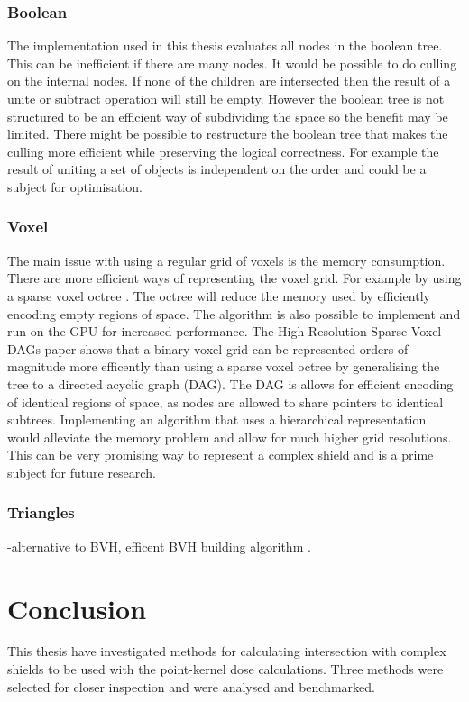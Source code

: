 \documentclass[11pt,twoside,a4paper]{report}
\begin{document}
\subsection{Boolean}
The implementation used in this thesis evaluates all nodes in the boolean tree. This can be inefficient if there are many nodes. It would be possible to do culling on the internal nodes. If none of the children are intersected then the result of a unite or subtract operation will still be empty. However the boolean tree is not structured to be an efficient way of subdividing the space so the benefit may be limited. There might be possible to restructure the boolean tree that makes the culling more efficient while preserving the logical correctness. For example the result of uniting a set of objects is independent on the order and could be a subject for optimisation.

\subsection{Voxel}
The main issue with using a regular grid of voxels is the memory consumption. There are more efficient ways of representing the voxel grid. For example by using a sparse voxel octree \cite{laine2011efficient}. The octree will reduce the memory used by efficiently encoding empty regions of space. The algorithm is also possible to implement and run on the GPU for increased performance. The High Resolution Sparse Voxel DAGs \cite{kampe2013high} paper shows that a binary voxel grid can be represented orders of magnitude more efficently than using a sparse voxel octree by generalising the tree to a directed acyclic graph (DAG). The DAG is allows for efficient encoding of identical regions of space, as nodes are allowed to share pointers to identical subtrees. Implementing an algorithm that uses a hierarchical representation would alleviate the memory problem and allow for much higher grid resolutions. This can be very promising way to represent a complex shield and is a prime subject for future research.

\subsection{Triangles}
-alternative to BVH, efficent BVH building algorithm \cite{gu2013efficient}.



\chapter{Conclusion}
\label{chapter:Conclusion}
This thesis have investigated methods for calculating intersection with complex shields to be used with the point-kernel dose calculations. Three methods were selected for closer inspection and were analysed and benchmarked.
\end{document}
